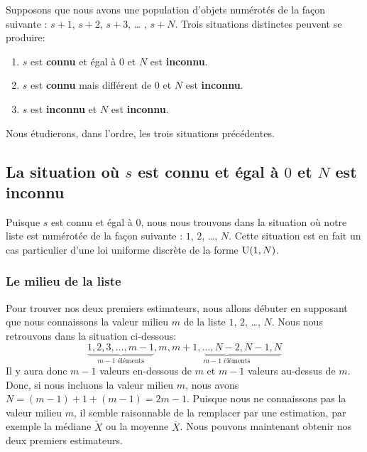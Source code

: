 \documentclass[10pt]{article}
\begin{document}
Supposons que nous avons une population d'objets numérotés de la façon
suivante : \(s+1\), \(s+2\), \(s+3\), \ldots{} , \(s+N\). Trois
situations distinctes peuvent se produire:

\begin{enumerate}
\def\labelenumi{\arabic{enumi}.}
\item
  \(s\) est \textbf{connu} et égal à \(0\) et \(N\) est
  \textbf{inconnu}.
\item
  \(s\) est \textbf{connu} mais différent de \(0\) et \(N\) est
  \textbf{inconnu}.
\item
  \(s\) est \textbf{inconnu} et \(N\) est \textbf{inconnu}.
\end{enumerate}

Nous étudierons, dans l'ordre, les trois situations précédentes.

\hypertarget{la-situation-ou-s-est-connu-et-egal-a-0-et-n-est-inconnu}{%
\subsection{\texorpdfstring{La situation où \(s\) est \textbf{connu} et
égal à \(0\) et \(N\) est
\textbf{inconnu}}{La situation où s est connu et égal à 0 et N est inconnu}}\label{la-situation-ou-s-est-connu-et-egal-a-0-et-n-est-inconnu}}

Puisque \(s\) est connu et égal à \(0\), nous nous trouvons dans la
situation où notre liste est numérotée de la façon suivante : \(1\),
\(2\), \ldots{}, \(N\). Cette situation est en fait un cas particulier
d'une loi uniforme discrète de la forme \(\operatorname{U}(1,N)\).

\hypertarget{le-milieu-de-la-liste}{%
\subsubsection{Le milieu de la liste}\label{le-milieu-de-la-liste}}

Pour trouver nos deux premiers estimateurs, nous allons débuter en
supposant que nous connaissons la valeur milieu \(m\) de la liste \(1\),
\(2\), \ldots{}, \(N\). Nous nous retrouvons dans la situation
ci-dessous:
\[\underbrace{1,2,3,\ldots,m-1}_{m-1 \text{ éléments}},m,\underbrace{m+1,\ldots,N-2,N-1,N}_{m-1 \text{ éléments}}\]
Il y aura donc \(m-1\) valeurs en-dessous de \(m\) et \(m-1\) valeurs
au-dessus de \(m\). Donc, si nous incluons la valeur milieu \(m\), nous
avons \(N=(m-1)+1+(m-1)=2m-1\). Puisque nous ne connaissons pas la
valeur milieu \(m\), il semble raisonnable de la remplacer par une
estimation, par exemple la médiane \(\widetilde{X}\) ou la moyenne
\(\overline{X}\). Nous pouvons maintenant obtenir nos deux premiers
estimateurs.
\end{document}
